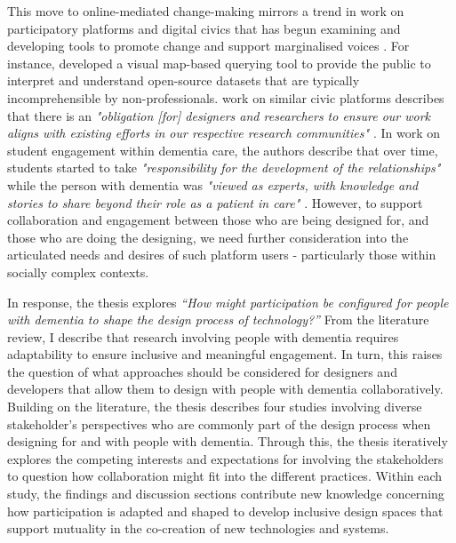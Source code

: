 This move to online-mediated change-making mirrors a trend in work on participatory platforms and digital civics that has begun examining and developing tools to promote change and support marginalised voices \citep{corbett_exploring_2018}. For instance, \cite{puussaar_making_2018} developed a visual map-based querying tool to provide the public to interpret and understand open-source datasets that are typically incomprehensible by non-professionals. \cite{asad_tap_2017} work on similar civic platforms describes that there is an \textit{"obligation [for] designers and researchers to ensure our work aligns with existing efforts in our respective research communities" \citep[pg. 6314]{asad_tap_2017}}. In \cite{foley_student_2020} work on student engagement within dementia care, the authors describe that over time, students started to take \textit{"responsibility for the development of the relationships"} while the person with dementia was \textit{"viewed as experts, with knowledge and stories to share beyond their role as a patient in care" \citep[pg. 9]{foley_student_2020}}. However, to support collaboration and engagement between those who are being designed for, and those who are doing the designing, we need further consideration into the articulated needs and desires of such platform users - particularly those within socially complex contexts. 

In response, the thesis explores \textit{``How might participation be configured for people with dementia to shape the design process of technology?''} From the literature review, I describe that research involving people with dementia requires adaptability to ensure inclusive and meaningful engagement. In turn, this raises the question of what approaches should be considered for designers and developers that allow them to design with people with dementia collaboratively. Building on the literature, the thesis describes four studies involving diverse stakeholder's perspectives who are commonly part of the design process when designing for and with people with dementia. Through this, the thesis iteratively explores the competing interests and expectations for involving the stakeholders to question how collaboration might fit into the different practices. Within each study, the findings and discussion sections contribute new knowledge concerning how participation is adapted and shaped to develop inclusive design spaces that support mutuality in the co-creation of new technologies and systems.

